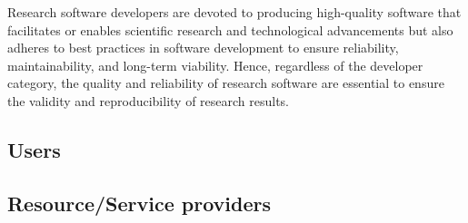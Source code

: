 Research software developers are devoted to producing high-quality software that facilitates or enables scientific research and technological advancements but also adheres to best practices in software development to ensure reliability, maintainability, and long-term viability. Hence, regardless of the developer category, the quality and reliability of research software are essential to ensure the validity and reproducibility of research results.


\subsection{Users}


\subsection{Resource/Service providers}

